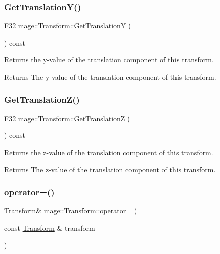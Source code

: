\subsubsection{\texorpdfstring{Get\+Translation\+Y()}{GetTranslationY()}}
{\footnotesize\ttfamily \hyperlink{namespacemage_aa97e833b45f06d60a0a9c4fc22ae02c0}{F32} mage\+::\+Transform\+::\+Get\+TranslationY (\begin{DoxyParamCaption}{ }\end{DoxyParamCaption}) const\hspace{0.3cm}{\ttfamily [noexcept]}}

Returns the y-\/value of the translation component of this transform.

\begin{DoxyReturn}{Returns}
The y-\/value of the translation component of this transform. 
\end{DoxyReturn}
\hypertarget{classmage_1_1_transform_a2899159e8e953026bf8b6863c65f454f}{}\label{classmage_1_1_transform_a2899159e8e953026bf8b6863c65f454f} 
\subsubsection{\texorpdfstring{Get\+Translation\+Z()}{GetTranslationZ()}}
{\footnotesize\ttfamily \hyperlink{namespacemage_aa97e833b45f06d60a0a9c4fc22ae02c0}{F32} mage\+::\+Transform\+::\+Get\+TranslationZ (\begin{DoxyParamCaption}{ }\end{DoxyParamCaption}) const\hspace{0.3cm}{\ttfamily [noexcept]}}

Returns the z-\/value of the translation component of this transform.

\begin{DoxyReturn}{Returns}
The z-\/value of the translation component of this transform. 
\end{DoxyReturn}
\hypertarget{classmage_1_1_transform_a399c432b387235b3ae964bfed27ac95c}{}\label{classmage_1_1_transform_a399c432b387235b3ae964bfed27ac95c} 
\subsubsection{\texorpdfstring{operator=()}{operator=()}\hspace{0.1cm}{\footnotesize\ttfamily [1/2]}}
{\footnotesize\ttfamily \hyperlink{classmage_1_1_transform}{Transform}\& mage\+::\+Transform\+::operator= (\begin{DoxyParamCaption}\item[{const \hyperlink{classmage_1_1_transform}{Transform} \&}]{transform }\end{DoxyParamCaption})\hspace{0.3cm}{\ttfamily [default]}}


